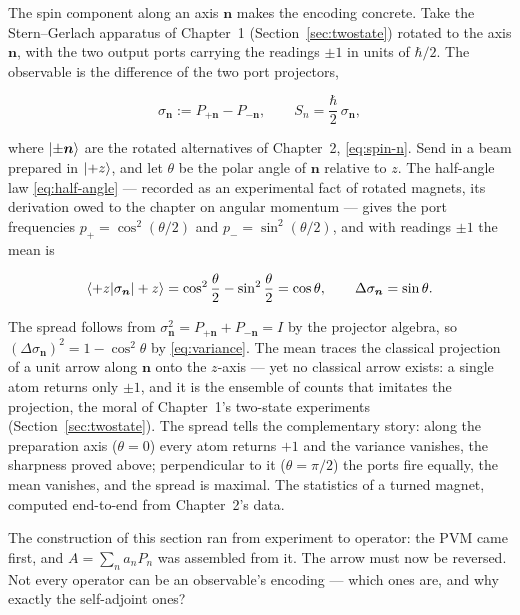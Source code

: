 The spin component along an axis $\bm n$ makes the encoding concrete. Take the Stern--Gerlach apparatus of Chapter~1 (Section~\ref{sec:twostate}) rotated to the axis $\bm n$, with the two output ports carrying the readings $\pm1$ in units of $\hbar/2$. The observable is the difference of the two port projectors,
\begin{linenomath}
\begin{equation}
    \sigma_{\bm n}:=P_{+\bm n}-P_{-\bm n},
    \qquad
    S_n=\frac{\hbar}{2}\,\sigma_{\bm n},
    \label{eq:sigma-n-def}
\end{equation}
\end{linenomath}
where $\ket{\pm\bm n}$ are the rotated alternatives of Chapter~2, \eqref{eq:spin-n}. Send in a beam prepared in $\ket{+z}$, and let $\theta$ be the polar angle of $\bm n$ relative to $z$. The half-angle law \eqref{eq:half-angle} --- recorded as an experimental fact of rotated magnets, its derivation owed to the chapter on angular momentum --- gives the port frequencies $p_+=\cos^2(\theta/2)$ and $p_-=\sin^2(\theta/2)$, and with readings $\pm1$ the mean is
\begin{linenomath}
\begin{equation}
    \braket{+z|\sigma_{\bm n}|+z}
    =\cos^2\frac{\theta}{2}-\sin^2\frac{\theta}{2}
    =\cos\theta,
    \qquad
    \Delta\sigma_{\bm n}=\sin\theta .
    \label{eq:spin-expectation}
\end{equation}
\end{linenomath}
The spread follows from $\sigma_{\bm n}^2=P_{+\bm n}+P_{-\bm n}=I$ by the projector algebra, so $(\Delta\sigma_{\bm n})^2=1-\cos^2\theta$ by \eqref{eq:variance}. The mean traces the classical projection of a unit arrow along $\bm n$ onto the $z$-axis --- yet no classical arrow exists: a single atom returns only $\pm1$, and it is the ensemble of counts that imitates the projection, the moral of Chapter~1's two-state experiments (Section~\ref{sec:twostate}). The spread tells the complementary story: along the preparation axis ($\theta=0$) every atom returns $+1$ and the variance vanishes, the sharpness proved above; perpendicular to it ($\theta=\pi/2$) the ports fire equally, the mean vanishes, and the spread is maximal. The statistics of a turned magnet, computed end-to-end from Chapter~2's data.

The construction of this section ran from experiment to operator: the PVM came first, and $A=\sum_na_nP_n$ was assembled from it. The arrow must now be reversed. Not every operator can be an observable's encoding --- which ones are, and why exactly the self-adjoint ones?


